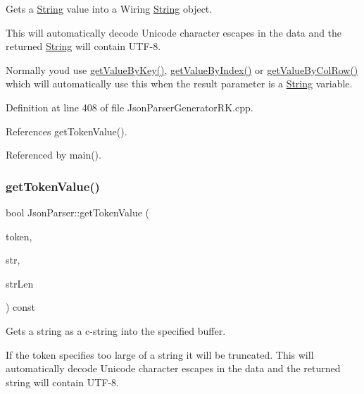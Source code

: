 Gets a \hyperlink{class_string}{String} value into a Wiring \hyperlink{class_string}{String} object. 

This will automatically decode Unicode character escapes in the data and the returned \hyperlink{class_string}{String} will contain U\+T\+F-\/8.

Normally you\textquotesingle{}d use \hyperlink{class_json_parser_a13abcdcb2341f65ac358bb4d81007d06}{get\+Value\+By\+Key()}, \hyperlink{class_json_parser_a53bd8a6ebb0d9b246b876653e792368f}{get\+Value\+By\+Index()} or \hyperlink{class_json_parser_af1f4a3a65b5cc9cd19b129c410aa78e0}{get\+Value\+By\+Col\+Row()} which will automatically use this when the result parameter is a \hyperlink{class_string}{String} variable. 

Definition at line 408 of file Json\+Parser\+Generator\+R\+K.\+cpp.



References get\+Token\+Value().



Referenced by main().

\mbox{\label{class_json_parser_aa5c0b33d4ddeae1e0d605e166a2a772c}} 
\subsubsection{\texorpdfstring{get\+Token\+Value()}{getTokenValue()}\hspace{0.1cm}{\footnotesize\ttfamily [7/8]}}
{\footnotesize\ttfamily bool Json\+Parser\+::get\+Token\+Value (\begin{DoxyParamCaption}\item[{const \hyperlink{struct_json_parser_generator_r_k_1_1jsmntok__t}{Json\+Parser\+Generator\+R\+K\+::jsmntok\+\_\+t} $\ast$}]{token,  }\item[{char $\ast$}]{str,  }\item[{size\+\_\+t \&}]{str\+Len }\end{DoxyParamCaption}) const}



Gets a string as a c-\/string into the specified buffer. 

If the token specifies too large of a string it will be truncated. This will automatically decode Unicode character escapes in the data and the returned string will contain U\+T\+F-\/8. 

